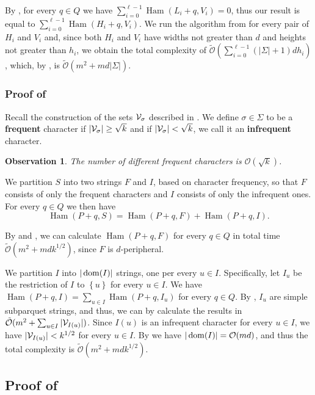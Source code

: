 \documentclass[11pt]{article}
\renewcommand{\O}{\mathcal{O}}
\newcommand{\tO}{\tilde{\mathcal{O}}}
\newcommand{\set}[1]{\left\lbrace #1 \right\rbrace}
\theoremstyle{plain}
\newtheorem{observation}{Observation}
\theoremstyle{definition}
\theoremstyle{remark}
\DeclareMathOperator*{\Ham}{Ham}
\begin{document}
By , for every $q \in Q$ we have $\sum_{i = 0}^{\ell - 1} \Ham(L_i + q, V_i) = 0$, thus our result is equal to $\sum_{i = 0}^{\ell - 1} \Ham(H_i + q, V_i)$.
We run the algorithm from  for every pair of $H_i$ and $V_i$ and, since both $H_i$ and $V_i$ have widths not greater than $d$ and heights not greater than $h_i$, we obtain the total complexity of $\tO(\sum_{i = 0}^{\ell - 1} (|\Sigma| + 1)dh_i)$, 
which, by , is $\tO(m^2 + md|\Sigma|)$.

\subsubsection{Proof of } \label{dense_algo_proof}

Recall the construction of the sets $\mathcal{V}_\sigma$ described in .
We define $\sigma \in \Sigma$ to be a \textbf{frequent} character if $|\mathcal{V}_\sigma| \ge \sqrt{k}$ and if $|\mathcal{V}_\sigma| < \sqrt{k}$, we call it an \textbf{infrequent} character.
\begin{observation}\label{frequent_character_bound}
	The number of different frequent characters is $\O(\sqrt{k})$.
\end{observation}


We partition $S$ into two strings $F$ and $I$, based on character frequency,
so that $F$ consists of only the frequent characters and $I$ consists of only the infrequent ones.
For every $q \in Q$ we then have 
\[\Ham(P + q, S) = \Ham(P + q, F) + \Ham(P + q, I).\]

By  and , we can calculate $\Ham(P + q, F)$ for every $q \in Q$ in total time $\tO(m^2 + mdk^{1/2})$, since $F$ is $d$-peripheral. 

We partition $I$ into $|\operatorname*{dom}(I)|$ strings, one per every $u \in I$.
Specifically, let $I_u$ be the restriction of $I$ to $\set{u}$ for every $u \in I$.
We have $\Ham(P + q, I) = \sum_{u \in I} \Ham(P + q, I_u)$ for every $q \in Q$.
By , $I_u$ are simple subparquet strings, and thus, we can by  calculate the results in $\tO(m^2 + \sum_{u \in I} |\V_{I(u)}|)$.
Since $I(u)$ is an infrequent character for every $u \in I$, we have $|\mathcal{V}_{I(u)}| < k^{1/2}$ for every $u \in I$.
By  we have $|\d{I}| = \O(md)$, and thus the total complexity is $\tO(m^2 + mdk^{1/2})$.

\subsection{Proof of } \label{get_periods_proof}
\end{document}
